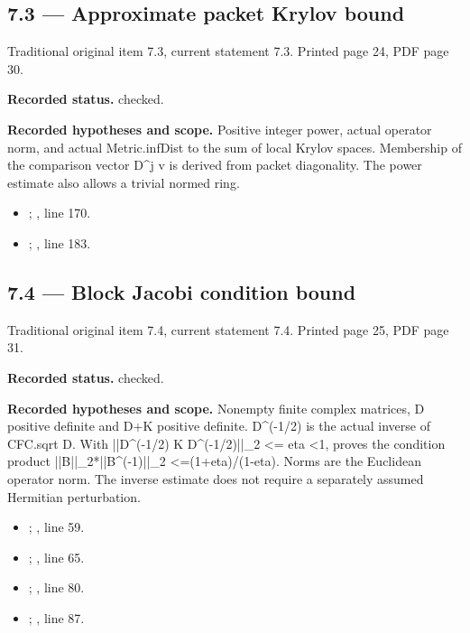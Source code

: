 \subsection{7.3 — Approximate packet Krylov bound}
\label{result:7.3}
{\footnotesize\color{muted}Traditional original item 7.3, current statement 7.3. Printed page 24, PDF page 30.}\par
\textbf{Recorded status.} checked.

\textbf{Recorded hypotheses and scope.} Positive integer power, actual operator norm, and actual Metric.infDist to the sum of local Krylov spaces. Membership of the comparison vector D\textasciicircum{}j v is derived from packet diagonality. The power estimate also allows a trivial normed ring.

\begin{itemize}
\item {}; , line 170.
\item {}; , line 183.
\end{itemize}
\subsection{7.4 — Block Jacobi condition bound}
\label{result:7.4}
{\footnotesize\color{muted}Traditional original item 7.4, current statement 7.4. Printed page 25, PDF page 31.}\par
\textbf{Recorded status.} checked.

\textbf{Recorded hypotheses and scope.} Nonempty finite complex matrices, D positive definite and D+K positive definite. D\textasciicircum{}(-1/2) is the actual inverse of CFC.sqrt D. With ||D\textasciicircum{}(-1/2) K D\textasciicircum{}(-1/2)||\_2 <= eta <1, proves the condition product ||B||\_2*||B\textasciicircum{}(-1)||\_2 <=(1+eta)/(1-eta). Norms are the Euclidean operator norm. The inverse estimate does not require a separately assumed Hermitian perturbation.

\begin{itemize}
\item {}; , line 59.
\item {}; , line 65.
\item {}; , line 80.
\item {}; , line 87.
\end{itemize}
